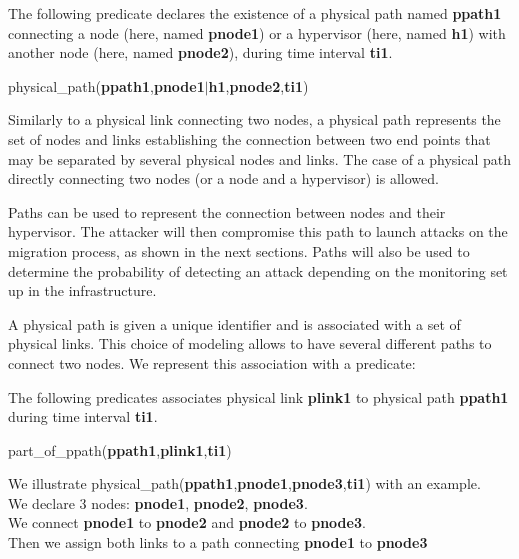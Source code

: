 The following predicate declares the existence of a physical path named \textbf{ppath1} connecting a node (here, named \textbf{pnode1}) or a hypervisor (here, named \textbf{h1}) with another node (here, named \textbf{pnode2}), during time interval \textbf{ti1}. 
\begin{myformula}
physical\_path(\textbf{ppath1},\textbf{pnode1}$\vert$\textbf{h1},\textbf{pnode2},\textbf{ti1})
\end{myformula}


Similarly to a physical link connecting two nodes, a physical path represents the set of nodes and links establishing the connection between two end points that may be separated by several physical nodes and links.
The case of a physical path directly connecting two nodes (or a node and a hypervisor) is allowed.

Paths can be used to represent the connection between nodes and their hypervisor.
The attacker will then compromise this path to launch attacks on the migration process, as shown in the next sections. Paths will also be used to determine the probability of detecting an attack depending on the monitoring set up in the infrastructure.

A physical path is given a unique identifier and is associated with a set of physical links. 
This choice of modeling allows to have several different paths to connect two nodes. 
We represent this association with a predicate:

The following predicates associates physical link \textbf{plink1} to physical path \textbf{ppath1} during time interval \textbf{ti1}.
\begin{myformula}
part\_of\_ppath(\textbf{ppath1},\textbf{plink1},\textbf{ti1})
\end{myformula}


We illustrate physical\_path(\textbf{ppath1},\textbf{pnode1},\textbf{pnode3},\textbf{ti1}) with an example.\\
We declare 3 nodes: \textbf{pnode1}, \textbf{pnode2}, \textbf{pnode3}.\\
We connect \textbf{pnode1} to \textbf{pnode2} and \textbf{pnode2} to \textbf{pnode3}.\\
Then we assign both links to a path connecting \textbf{pnode1} to \textbf{pnode3}

